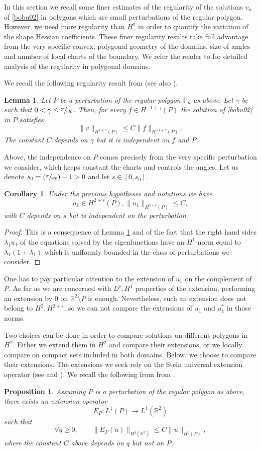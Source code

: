 \documentclass[JEP,XML,SOM,Unicode,ThmDefs,NoFloatCountersInSection,published]{cedram}
\newcommand{\Psfrac}[2]{(\sfrac{#1}{#2})}
\theoremstyle{plain}
\newtheorem{lemma}[thm]{Lemma}
\newtheorem{cor}[thm]{Corollary}
\newtheorem{propo}[thm]{Proposition}
\theoremstyle{definition}
\let\Bbb\mathbb
\def\R{\mathbb{R}}
\newcommand{\lb}{\lambda}
\newcommand{\sm}{\setminus}
\begin{document}
In this section we recall some finer estimates of the regularity of the solutions $v_\alpha$ of \eqref{bobu02} in polygons which are small perturbations of the regular polygon. However, we need more regularity than $H^2$ in order to quantify the variation of the shape Hessian coefficients. These finer regularity results take full advantage from the very specific convex, polygonal geometry of the domains, size of angles and number of local charts of the boundary. We refer the reader to \cite{Da88} for detailed analysis of the regularity in polygonal domains.

We recall the following regularity result from \cite[Th.\,9.8]{BDLN92} (see also \cite{Da88}).
\begin{lemma}\label{bobu12}
Let $P$ be a perturbation of the regular polygon $\Bbb{P}_n$ as above. Let $\gamma$ be such that $0<\gamma\le \sfrac {\pi}{\omega_{0}}$. Then, for every $f \in H^{-1+ \gamma } (P)$ the solution of \eqref{bobu02} in $P$ satisfies
\[
\|v\|_{H^{1+\gamma}(P)} \le C \|f\|_{H^{-1+\gamma} (P)}.
\]
The constant $C$ depends on $\gamma$ but it is independent on $f$ and $P$.
\end{lemma}
Above, the independence on $P$ comes precisely from the very specific perturbation we consider, which keeps constant the charts and controls the angles. Let us denote $s_0 = \Psfrac {\pi}{\omega_{0}} - 1>0$ and let $s\in[0,s_0]$.
\begin{cor}
Under the previous hypotheses and notations we have
\[
u_1\in H^{2+s} (P), \|u_1\|_{H^{2+s} (P)} \le C,
\]
with $C$ depends on $s$ but is independent on the perturbation.
\end{cor}
\begin{proof}
This is a consequence of Lemma \ref{bobu12} and of the fact that the right hand sides $\lb_1 u_1$ of the equations solved by the eigenfunctions have an $H^1$-norm equal to $\lb_1 (1+ \lb_1)$ which is uniformly bounded in the class of perturbations we consider.
\end{proof}

One has to pay particular attention to the extension of $u_1$ on the complement of~$P$. As far as we are concerned with $L^p, H^1$ properties of the extension, performing an extension by $0$ on $\R^2\sm P$ is enough. Nevertheless, such an extension does not belong to $H^2, H^{2+s}$, so we can not compare the extensions of $u_1$ and $u_1^*$ in those norms.

Two choices can be done in order to compare solutions on different polygons in $H^2$. Either we extend them in $H^2$ and compare their extensions, or we locally compare on compact sets included in both domains. Below, we choose to compare their extensions. The extensions we seek rely on the Stein universal extension operator (see \cite{St70} and \cite{LaVi19,HLZ12}). We recall the following from from \cite{ St70}.
\begin{propo} \label{bobu13}
Assuming $P$ is a perturbation of the regular polygon as above, there exists an extension operator
\[
E_P: L^1(P) \to L^1(\R^2)
\]
such that
\[
\forall q \ge 0, \qquad \| E_P(u) \|_{H^q (\R^2)} \le C\| u\|_{H^q(P)},
\]
where the constant $C$ above depends on $q$ but not on $P$.
\end{propo}
\end{document}
